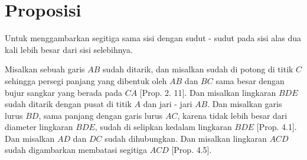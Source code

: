 \documentclass[a4paper]{book}
\begin{document}
\section*{\centering Proposisi \thesection}
Untuk menggambarkan segitiga sama sisi dengan sudut - sudut pada sisi alas
dua kali lebih besar dari sisi selebihnya.
\begin{center} 
\end{center} 
 
Misalkan sebuah garis $AB$ sudah ditarik, dan misalkan sudah di potong di
titik $C$ sehingga persegi panjang yang dibentuk oleh $AB$ dan $BC$ sama
besar dengan bujur sangkar yang berada pada $CA$ [Prop. 2. 11]. Dan 
misalkan lingkaran $BDE$ sudah ditarik dengan pusat di titik $A$ dan 
jari - jari $AB$. Dan misalkan garis lurus $BD$, sama panjang dengan 
garis lurus $AC$, karena tidak lebih besar dari diameter lingkaran $BDE$, 
sudah di selipkan kedalam lingkaran $BDE$ [Prop. 4.1]. Dan misalkan $AD$
dan $DC$ sudah dihubungkan. Dan misalkan lingkaran $ACD$ sudah digambarkan
membatasi segitiga $ACD$ [Prop. 4.5].
\end{document}
